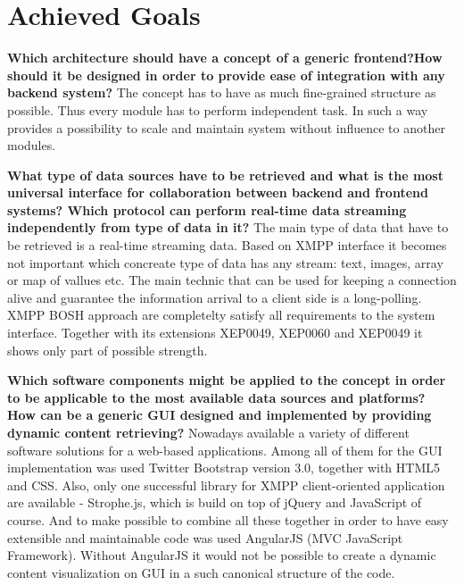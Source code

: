 \section{Achieved Goals}
	   \textbf{Which architecture should have a concept of a generic frontend?How should it be designed in order to provide ease of integration with any backend system?}
	   \newline
	   The concept has to have as much fine-grained structure as possible. Thus every module has to perform independent task. In such a way provides a possibility to scale and maintain system without influence to another modules. 

       \textbf{What type of data sources have to be retrieved and what is the most universal interface for collaboration between backend and frontend systems? Which protocol can perform real-time data streaming independently from type of data in it?}
       \newline
       The main type of data that have to be retrieved is a real-time streaming data. Based on XMPP interface it becomes not important which concreate type of data has any stream: text, images, array or map of vallues etc. The main technic that can be used for keeping a connection alive and guarantee the information arrival to a client side is a long-polling. 
       \newline
       XMPP BOSH approach are completelty satisfy all requirements to the system interface. Together with its extensions XEP0049, XEP0060 and XEP0049 it shows only part of possible strength.

       \textbf{Which software components might be applied to the concept in order to be applicable to the most available data sources and platforms? How can be a generic GUI designed and implemented by providing dynamic content retrieving?} 
       \newline
       Nowadays available a variety of different software solutions for a web-based applications. Among all of them for the GUI implementation was used Twitter Bootstrap version 3.0, together with HTML5 and CSS. Also, only one successful library for XMPP client-oriented application are available - Strophe.js, which is build on top of jQuery and JavaScript of course. And to make possible to combine all these together in order to have easy extensible and maintainable code was used AngularJS (MVC JavaScript Framework). Without AngularJS it would not be possible to create a dynamic content visualization on GUI in a such canonical structure of the code.


